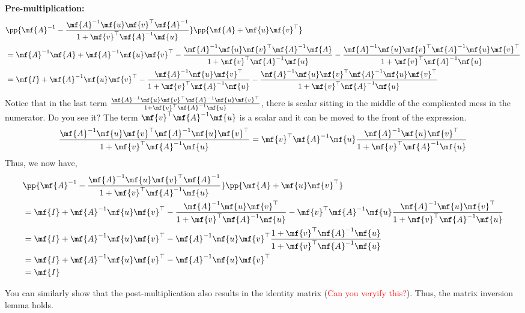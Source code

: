 \begin{enumerate}
\begin{boxedstuff}
        \textbf{Pre-multiplication:}
        \[ 
        \begin{split}
            & \pp{\mf{A}^{-1} - \frac{\mf{A}^{-1}\mf{u}\mf{v}^\top\mf{A}^{-1}}{1 + \mf{v}^{\top}\mf{A}^{-1}\mf{u}}}\pp{\mf{A} + \mf{u}\mf{v}^\top} \\
            &= \mf{A}^{-1}\mf{A} + \mf{A}^{-1}\mf{u}\mf{v}^\top - \frac{\mf{A}^{-1}\mf{u}\mf{v}^\top\mf{A}^{-1}\mf{A}}{1 + \mf{v}^{\top}\mf{A}^{-1}\mf{u}} - \frac{\mf{A}^{-1}\mf{u}\mf{v}^\top\mf{A}^{-1}\mf{u}\mf{v}^\top}{1 + \mf{v}^{\top}\mf{A}^{-1}\mf{u}} \\
            &= \mf{I} + \mf{A}^{-1}\mf{u}\mf{v}^\top - \frac{\mf{A}^{-1}\mf{u}\mf{v}^\top}{1 + \mf{v}^{\top}\mf{A}^{-1}\mf{u}} - \frac{\mf{A}^{-1}\mf{u}\mf{v}^\top\mf{A}^{-1}\mf{u}\mf{v}^\top}{1 + \mf{v}^{\top}\mf{A}^{-1}\mf{u}}
        \end{split}
        \]
        Notice that in the last term $\frac{\mf{A}^{-1}\mf{u}\mf{v}^\top\mf{A}^{-1}\mf{u}\mf{v}^\top}{1 + \mf{v}^{\top}\mf{A}^{-1}\mf{u}}$, there is scalar sitting in the middle of the complicated mess in the numerator. Do you see it? The term $\mf{v}^{\top}\mf{A}^{-1}\mf{u}$ is a scalar and it can be moved to the front of the expression. 
        \[ \frac{\mf{A}^{-1}\mf{u}\mf{v}^\top\mf{A}^{-1}\mf{u}\mf{v}^\top}{1 + \mf{v}^{\top}\mf{A}^{-1}\mf{u}} = \mf{v}^\top\mf{A}^{-1}\mf{u}\frac{\mf{A}^{-1}\mf{u}\mf{v}^\top}{1 + \mf{v}^{\top}\mf{A}^{-1}\mf{u}} \]
        Thus, we now have,
        \[ 
        \begin{split}
            & \pp{\mf{A}^{-1} - \frac{\mf{A}^{-1}\mf{u}\mf{v}^\top\mf{A}^{-1}}{1 + \mf{v}^{\top}\mf{A}^{-1}\mf{u}}}\pp{\mf{A} + \mf{u}\mf{v}^\top} \\
            &= \mf{I} + \mf{A}^{-1}\mf{u}\mf{v}^\top - \frac{\mf{A}^{-1}\mf{u}\mf{v}^\top}{1 + \mf{v}^{\top}\mf{A}^{-1}\mf{u}} - \mf{v}^\top\mf{A}^{-1}\mf{u}\frac{\mf{A}^{-1}\mf{u}\mf{v}^\top}{1 + \mf{v}^{\top}\mf{A}^{-1}\mf{u}} \\
            &= \mf{I} + \mf{A}^{-1}\mf{u}\mf{v}^\top - \mf{A}^{-1}\mf{u}\mf{v}^\top \frac{1 + \mf{v}^{\top}\mf{A}^{-1}\mf{u}}{1 + \mf{v}^{\top}\mf{A}^{-1}\mf{u}}\\
            &= \mf{I} + \mf{A}^{-1}\mf{u}\mf{v}^\top - \mf{A}^{-1}\mf{u}\mf{v}^\top \\
            &= \mf{I}
        \end{split}
        \]
        
        You can similarly show that the post-multiplication also results in the identity matrix (\textcolor{red}{Can you veryify this?}). Thus, the matrix inversion lemma holds.
    \end{boxedstuff}


\end{enumerate}
